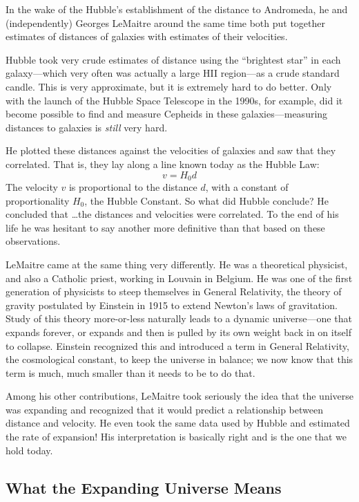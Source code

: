 \documentclass[12pt, preprint]{aastex}
\begin{document}
In the wake of the Hubble's establishment of the distance to
Andromeda, he and (independently) Georges LeMaitre around the same
time both put together estimates of distances of galaxies with
estimates of their velocities.

Hubble took very crude estimates of distance using the ``brightest
star'' in each galaxy---which very often was actually a large HII
region---as a crude standard candle. This is very approximate, but it
is extremely hard to do better. Only with the launch of the Hubble
Space Telescope in the 1990s, for example, did it become possible to
find and measure Cepheids in these galaxies---measuring distances to
galaxies is {\it still} very hard.

He plotted these distances against the
velocities of galaxies and saw that they correlated. That is, they lay
along a line known today as the Hubble Law:
\begin{equation}
  v = H_0 d
\end{equation}
The velocity $v$ is proportional to the distance $d$, with a constant
of proportionality $H_0$, the Hubble Constant.  So what did Hubble
conclude? He concluded that \ldots the distances and velocities were
correlated. To the end of his life he was hesitant to say another more
definitive than that based on these observations.

LeMaitre came at the same thing very differently. He was a theoretical
physicist, and also a Catholic priest, working in Louvain in
Belgium. He was one of the first generation of physicists to steep
themselves in General Relativity, the theory of gravity postulated by
Einstein in 1915 to extend Newton's laws of gravitation. Study of this
theory more-or-less naturally leads to a dynamic universe---one that
expands forever, or expands and then is pulled by its own weight back
in on itself to collapse. Einstein recognized this and introduced a
term in General Relativity, the cosmological constant, to keep the
universe in balance; we now know that this term is much, much smaller
than it needs to be to do that.

Among his other contributions, LeMaitre took seriously the idea that
the universe was expanding and recognized that it would predict a
relationship between distance and velocity. He even took the same data
used by Hubble and estimated the rate of expansion! His interpretation
is basically right and is the one that we hold today.

\subsection{What the Expanding Universe Means}
\end{document}
